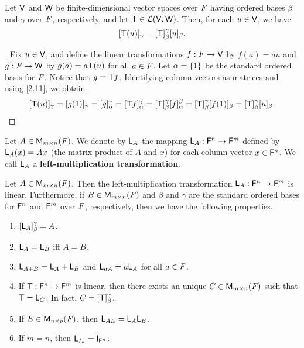 \begin{thm}\label{2.14}
  Let \(\mathsf{V}\) and \(\mathsf{W}\) be finite-dimensional vector spaces over \(\mathit{F}\) having ordered bases \(\beta\) and \(\gamma\) over \(\mathit{F}\), respectively, and let \(\mathsf{T} \in \mathcal{L}(\mathsf{V}, \mathsf{W})\).
  Then, for each \(u \in \mathsf{V}\), we have
  \[
    [\mathsf{T}(u)]_{\gamma} = [\mathsf{T}]_{\beta}^{\gamma} [u]_{\beta}.
  \]
\end{thm}

\begin{proof}[]
  Fix \(u \in \mathsf{V}\), and define the linear transformations \(f : \mathit{F} \to \mathsf{V}\) by \(f(a) = au\) and \(g : \mathit{F} \to \mathsf{W}\) by \(g(a) = a \mathsf{T}(u)\) for all \(a \in \mathit{F}\).
  Let \(\alpha = \left\lbrace1\right\rbrace\) be the standard ordered basis for \(\mathit{F}\).
  Notice that \(g = \mathsf{T} f\).
  Identifying column vectors as matrices and using \cref{2.11}, we obtain
  \[
    [\mathsf{T}(u)]_{\gamma} = [g(1)]_{\gamma} = [g]_{\alpha}^{\gamma} = [\mathsf{T} f]_{\alpha}^{\gamma} = [\mathsf{T}]_{\beta}^{\gamma} [f]_{\alpha}^{\beta} = [\mathsf{T}]_{\beta}^{\gamma} [f(1)]_{\beta} = [\mathsf{T}]_{\beta}^{\gamma} [u]_{\beta}.
  \]
\end{proof}

\begin{defn}\label{2.3.8}
  Let \(A \in \ms[m][n][\F]\).
  We denote by \(\mathsf{L}_A\) the mapping \(\mathsf{L}_A : \mathsf{F}^n \to \mathsf{F}^m\) defined by \(\mathsf{L}_A(x) = Ax\) (the matrix product of \(A\) and \(x\)) for each column vector \(x \in \mathsf{F}^n\).
  We call \(\mathsf{L}_A\) a \textbf{left-multiplication transformation}.
\end{defn}

\begin{thm}\label{2.15}
  Let \(A \in \ms\).
  Then the left-multiplication transformation \(\mathsf{L}_A : \mathsf{F}^n \to \mathsf{F}^m\) is linear.
  Furthermore, if \(B \in \ms\) and \(\beta\) and \(\gamma\) are the standard ordered bases for \(\mathsf{F}^n\) and \(\mathsf{F}^m\) over \(\mathit{F}\), respectively, then we have the following properties.
  \begin{enumerate}
    \item \([\mathsf{L}_A]_{\beta}^{\gamma} = A\).
    \item \(\mathsf{L}_A = \mathsf{L}_B\) iff \(A = B\).
    \item \(\mathsf{L}_{A + B} = \mathsf{L}_A + \mathsf{L}_B\) and \(\mathsf{L}_{aA} = a \mathsf{L}_A\) for all \(a \in \mathit{F}\).
    \item If \(\mathsf{T} : \mathsf{F}^n \to \mathsf{F}^m\) is linear, then there exists an unique \(C \in \ms\) such that \(\mathsf{T} = \mathsf{L}_C\).
          In fact, \(C = [\mathsf{T}]_{\beta}^{\gamma}\).
    \item If \(E \in \ms[n][p][\F]\), then \(\mathsf{L}_{AE} = \mathsf{L}_A \mathsf{L}_E\).
    \item If \(m = n\), then \(\L_{I_n} = \IT[\vs{F}^n]\).
  \end{enumerate}
\end{thm}

